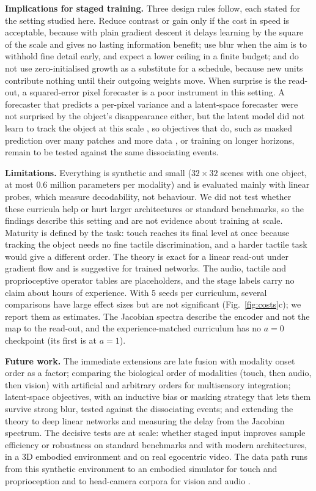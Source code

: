 \documentclass{article}
\theoremstyle{plain}
\theoremstyle{remark}
\begin{document}
\textbf{Implications for staged training.} Three design rules follow, each stated for the setting studied here. Reduce contrast or gain only if the cost in speed is acceptable, because with plain gradient descent it delays learning by the square of the scale and gives no lasting information benefit; use blur when the aim is to withhold fine detail early, and expect a lower ceiling in a finite budget; and do not use zero-initialised growth as a substitute for a schedule, because new units contribute nothing until their outgoing weights move. When surprise is the read-out, a squared-error pixel forecaster is a poor instrument in this setting. A forecaster that predicts a per-pixel variance and a latent-space forecaster were not surprised by the object's disappearance either, but the latent model did not learn to track the object at this scale \autocite{mohapatra2026senses}, so objectives that do, such as masked prediction over many patches and more data \autocite{garrido2025intuitive}, or training on longer horizons, remain to be tested against the same dissociating events.

\textbf{Limitations.} Everything is synthetic and small (\(32\times32\) scenes with one object, at most 0.6 million parameters per modality) and is evaluated mainly with linear probes, which measure decodability, not behaviour. We did not test whether these curricula help or hurt larger architectures or standard benchmarks, so the findings describe this setting and are not evidence about training at scale. Maturity is defined by the task: touch reaches its final level at once because tracking the object needs no fine tactile discrimination, and a harder tactile task would give a different order. The theory is exact for a linear read-out under gradient flow and is suggestive for trained networks. The audio, tactile and proprioceptive operator tables are placeholders, and the stage labels carry no claim about hours of experience. With 5 seeds per curriculum, several comparisons have large effect sizes but are not significant (Fig.~\ref{fig:costs}c); we report them as estimates. The Jacobian spectra describe the encoder and not the map to the read-out, and the experience-matched curriculum has no \(a=0\) checkpoint (its first is at \(a=1\)).

\textbf{Future work.} The immediate extensions are late fusion with modality onset order as a factor; comparing the biological order of modalities (touch, then audio, then vision) with artificial and arbitrary orders for multisensory integration; latent-space objectives, with an inductive bias or masking strategy that lets them survive strong blur, tested against the dissociating events; and extending the theory to deep linear networks and measuring the delay from the Jacobian spectrum. The decisive tests are at scale: whether staged input improves sample efficiency or robustness on standard benchmarks and with modern architectures, in a 3D embodied environment and on real egocentric video. The data path runs from this synthetic environment to an embodied simulator for touch and proprioception \autocite{mattern2024mimo} and to head-camera corpora for vision and audio \autocite{sullivan2021saycam,long2024babyview}.
\end{document}
